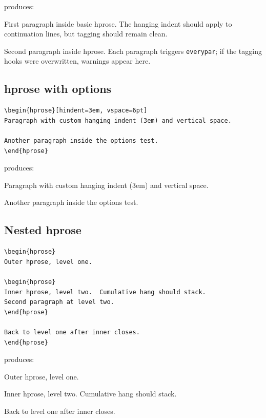 \documentclass[11pt, twoside, openany]{article}
\begin{document}
\noindent produces:

\begin{hprose}
First paragraph inside basic hprose. The hanging indent should apply
to continuation lines, but tagging should remain clean. \lipsum[3][1-3]

Second paragraph inside hprose. Each paragraph triggers \texttt{everypar};
if the tagging hooks were overwritten, warnings appear here.
\lipsum[4][1-3]
\end{hprose}

\subsection*{hprose with options}

\begin{verbatim}
\begin{hprose}[hindent=3em, vspace=6pt]
Paragraph with custom hanging indent (3em) and vertical space.

Another paragraph inside the options test.
\end{hprose}
\end{verbatim}

\noindent produces:

\begin{hprose}[hindent=3em, vspace=6pt]
Paragraph with custom hanging indent (3em) and vertical space.
\lipsum[5][1-3]

Another paragraph inside the options test. \lipsum[6][1-3]
\end{hprose}

\subsection*{Nested hprose}

\begin{verbatim}
\begin{hprose}
Outer hprose, level one.

\begin{hprose}
Inner hprose, level two.  Cumulative hang should stack.
Second paragraph at level two.
\end{hprose}

Back to level one after inner closes.
\end{hprose}
\end{verbatim}

\noindent produces:

\begin{hprose}
Outer hprose, level one. \lipsum[7][1-3]

\begin{hprose}
Inner hprose, level two. Cumulative hang should stack.
\lipsum[8][1-2]
\end{hprose}

Back to level one after inner closes. \lipsum[9][1-3]
\end{hprose}
\end{document}
